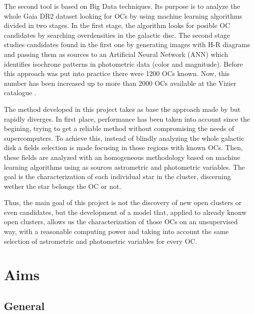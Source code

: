 \documentclass[11pt, a4paper, english]{book}
\begin{document}
The second tool is based on Big Data techniques. Its purpose is to analyze the whole Gaia DR2 dataset looking for OCs by using
machine learning algorithms divided in two stages. In the first stage, the algorithm looks for posible OC candidates by searching
overdensities in the galactic disc.
The second stage studies candidates found in the first one by generating images with H-R diagrams and passing them
as sources to an Artificial Neural Network (ANN) which identifies isochrone patterns in photometric data (color and magnitude).
Before this approach was put into practice there were 1200 OCs known. Now, this number has been increased up to more than 2000 OCs
available at the Vizier catalogue \cite{ochsenbein2000vizier}.

The method developed in this project takes as base the approach made by \citeauthor{castro2020hunting} but rapidly diverges.
In first place, performance has been taken into account since the begining, trying to get a reliable method without compromising the
needs of supercomputers.
To achieve this, instead of blindly analyzing the whole galactic disk a fields selection is made focusing in those regions with known OCs.
Then, these fields are analyzed with an homogeneous methodology based on machine learning algorithms using as sources astrometric and
photometric variables. The goal is the characterization of each individual star in the cluster, discerning wether the star belongs the OC
or not.

Thus, the main goal of this project is not the discovery of new open clusters or even candidates, but the development of a model that,
applied to already knonw open clusters, allows us the characterization of those OCs on an unsupervised way, with a reasonable computing
power and taking into account the same selection of astrometric and photometric variables for every OC.


\chapter{Aims}

\section{General}
\end{document}
